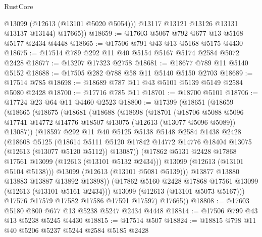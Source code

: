 \begin{lexlean}{RustCore}
\begin{coremodule}
            @13099
            (@12613 (@13101 @5020 @5054)))
          @13117
          @13121
          @13126
          @13131
          @13137
          @13144)
        @17665))
@18659 := @17603 @5067 @792 @677 @13 @5168 @5177 @2434 @4448
@18665 := @17506 @791 @43 @13 @5168 @5175 @4430
@18675 := @17514 @789 @292 @11 @40 @5154 @5167 @5174 @2584 @5072 @2428
@18677 := @13207 @17323 @2758
@18681 := @18677 @789 @11 @5140 @5152
@18688 := @17505 @282 @788 @58 @11 @5140 @5150 @2703
@18689 := @17514 @785
@18698 := @18689 @787 @11 @43 @5101 @5139 @5149 @2584 @5080 @2428
@18700 := @17716 @785 @11
@18701 := @18700 @5101
@18706 := @17724 @23 @64 @11 @4460 @2523
@18800 := @17399
    (@18651
      (@18659
        (@18665
          (@18675
            (@18681
              (@18688
                (@18698
                  (@18701
                    (@18706
                      @5088
                      @5096
                      @17741
                      @14772
                      @14776
                      @18507
                      @13075
                      (@12613 (@13077 @5096 @5089))
                      @13087))
                  (@18597
                    @292
                    @11
                    @40
                    @5125
                    @5138
                    @5148
                    @2584
                    @1438
                    @2428
                    (@18608
                      @5125
                      (@18614
                        @5111
                        @5120
                        @17842
                        @14772
                        @14776
                        @18404
                        @13075
                        (@12613 (@13077 @5120 @5112))
                        @13087))
                    (@17862 @5131 @2428 @17868 @17561 @13099 (@12613 (@13101 @5132 @2434)))
                    @13099
                    (@12613 (@13101 @5104 @5138)))
                  @13099
                  (@12613 (@13101 @5081 @5139)))
                @13877
                @13880
                @13883
                @13887
                @13892
                @13898))
            (@17862 @5160 @2428 @17868 @17561 @13099 (@12613 (@13101 @5161 @2434)))
            @13099
            (@12613 (@13101 @5073 @5167)))
          @17576
          @17579
          @17582
          @17586
          @17591
          @17597)
        @17665))
@18808 := @17603 @5180 @800 @677 @13 @5238 @5247 @2434 @4448
@18814 := @17506 @799 @43 @13 @5238 @5245 @4430
@18815 := @17514 @507
@18824 := @18815 @798 @11 @40 @5206 @5237 @5244 @2584 @5185 @2428

\end{coremodule}
\end{lexlean}
